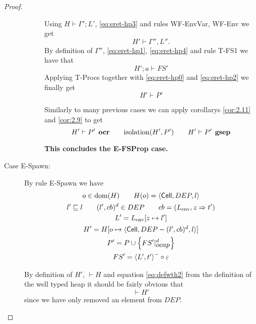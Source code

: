 \begin{proof}
\begin{description}
\begin{description}
          Using $H \vdash \Gamma'; L'$, \eqref{eq:eret-hp3} and rules {\sc WF-EnvVar}, {\sc
          WF-Env} we get
          \begin{equation} \label{eq:eret-hp4}
            H' \vdash \Gamma'', L''.
          \end{equation}
          By definition of $\Gamma''$, \eqref{eq:eret-hp1}, \eqref{eq:eret-hp4}
          and rule {\sc T-FS1} we have that
          \begin{equation} \label{eq:eret-hp2}
            H';a \vdash FS'
          \end{equation}
          Applying {\sc T-Procs} together with \eqref{eq:eret-hp0} and
          \eqref{eq:eret-hp2} we finally get
          \begin{equation}
            H' \vdash P'
          \end{equation}

          Similarly to many previous cases we can apply corollarys
          \ref{cor:2.11} and \ref{cor:2.9} to get
          \begin{equation*}
            H' \vdash P' \:\: \mbox{\bf ocr} \quad\quad \mbox{$\mathrm{isolation}$}(H', P') \quad\quad H'
            \vdash P' \:\: \mbox{\bf gsep}
          \end{equation*}
          
          {\bf This concludes the {\sc E-FSProp} case.}
      \end{description}

    \item[Case {\sc E-Spawn}:] By rule {\sc E-Spawn} we have
      \begin{equation}
        \begin{gathered} \label{eq:espawn1}
          o \in \mbox{$\mathrm{dom}$}(H) \quad\quad H(o) = \mbox{$\langle \mbox{$\mathsf{Cell}$}{}, DEP, l \rangle$} \\
          l' \sqsubseteq l \quad\quad (l', cb)^d \in DEP \quad\quad cb =
          (L_{\text{env}}, z \Rightarrow t') \\
          L' = L_{\text{env}}[z \mapsto l'] \\
          H' = H[o \mapsto \mbox{$\langle \mbox{$\mathsf{Cell}$}{}, DEP - (l', cb)^d, l \rangle$}] \\
          P' = P \cup \left\{ FS'|_{\mbox{$ocap$}}^d \right\} \\
          FS' = \mbox{$\langle L', t' \rangle$}^- \circ \varepsilon
        \end{gathered}
      \end{equation}
      
      By definition of $H'$, $\vdash H$ and equation \eqref{eq:defwth2} from the
      definition of the well typed heap it should be fairly obvious that
      \begin{equation}
        \vdash H'
      \end{equation}
      since we have only removed an element from $DEP$. 



\end{description}
\end{proof}
